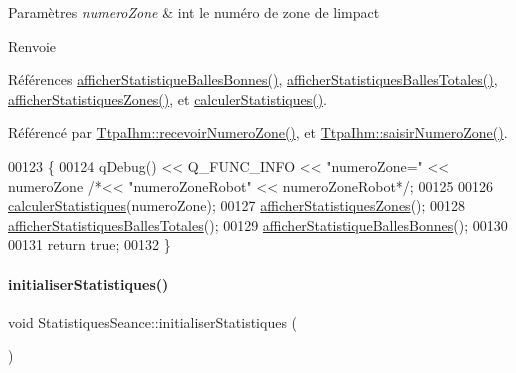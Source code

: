 \begin{DoxyParams}{Paramètres}
{\em numero\+Zone} & int le numéro de zone de l\textquotesingle{}impact \\
\hline
\end{DoxyParams}
\begin{DoxyReturn}{Renvoie}

\end{DoxyReturn}


Références \hyperlink{class_statistiques_seance_a712aad34b7ff7dd550ac6c976f75f416}{afficher\+Statistique\+Balles\+Bonnes()}, \hyperlink{class_statistiques_seance_a216b30bcfca71e425073a7ac90e59089}{afficher\+Statistiques\+Balles\+Totales()}, \hyperlink{class_statistiques_seance_afd9087c34222c0b2c0db11c5a96459c4}{afficher\+Statistiques\+Zones()}, et \hyperlink{class_statistiques_seance_a8bf60224113e3697adfe0a4f8f22ab7b}{calculer\+Statistiques()}.



Référencé par \hyperlink{class_ttpa_ihm_a0070bf0027c8a903e5bb5a543533e82c}{Ttpa\+Ihm\+::recevoir\+Numero\+Zone()}, et \hyperlink{class_ttpa_ihm_a9b22616e3a4e52ad2ecfe1818d5fadb2}{Ttpa\+Ihm\+::saisir\+Numero\+Zone()}.


\begin{DoxyCode}
00123 \{
00124     qDebug() << Q\_FUNC\_INFO << \textcolor{stringliteral}{"numeroZone="} << numeroZone \textcolor{comment}{/*<< "numeroZoneRobot" << numeroZoneRobot*/};
00125 
00126     \hyperlink{class_statistiques_seance_a8bf60224113e3697adfe0a4f8f22ab7b}{calculerStatistiques}(numeroZone);
00127     \hyperlink{class_statistiques_seance_afd9087c34222c0b2c0db11c5a96459c4}{afficherStatistiquesZones}();
00128     \hyperlink{class_statistiques_seance_a216b30bcfca71e425073a7ac90e59089}{afficherStatistiquesBallesTotales}();
00129     \hyperlink{class_statistiques_seance_a712aad34b7ff7dd550ac6c976f75f416}{afficherStatistiqueBallesBonnes}();
00130 
00131     \textcolor{keywordflow}{return} \textcolor{keyword}{true};
00132 \}
\end{DoxyCode}
\mbox{\label{class_statistiques_seance_a17e1c49e2986a8490ff96e4bd7733291}} 
\paragraph{\texorpdfstring{initialiser\+Statistiques()}{initialiserStatistiques()}}
{\footnotesize\ttfamily void Statistiques\+Seance\+::initialiser\+Statistiques (\begin{DoxyParamCaption}{ }\end{DoxyParamCaption})}



